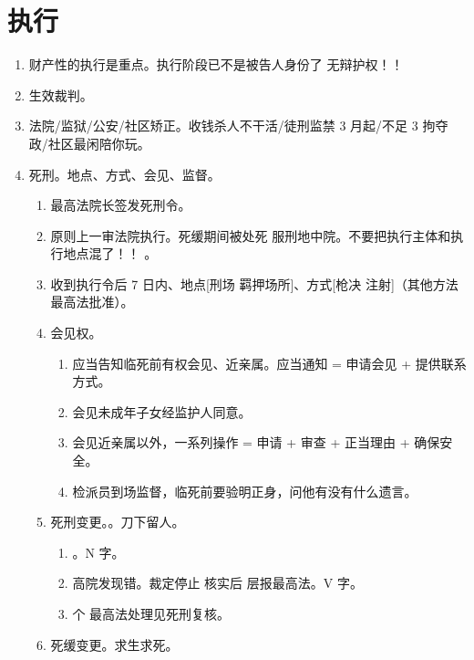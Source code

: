 \section{执行}
\begin{enumerate}
  \item 财产性的执行是重点。执行阶段已不是被告人身份了 \yjt 无辩护权！！
  \item 生效裁判。
  \item 法院/监狱/公安/社区矫正。收钱杀人不干活/徒刑监禁 3 月起/不足 3 拘夺政/社区最闲陪你玩。
  \item 死刑。地点、方式、会见、监督。
        \begin{enumerate}
          \item 最高法院长签发死刑令。
          \item 原则上一审法院执行。死缓期间被处死 \yjt 服刑地中院。不要把执行主体和执行地点混了！！
                。
          \item 收到执行令后 7 日内、地点[刑场 \hz 羁押场所]、方式[枪决 \hz 注射]（其他方法最高法批准）。
          \item 会见权。
                \begin{enumerate}
                  \item 应当告知临死前有权会见、近亲属。应当通知 = 申请会见 + 提供联系方式。
                  \item 会见未成年子女经监护人同意。
                  \item 会见近亲属以外，一系列操作 = 申请 + 审查 + 正当理由 + 确保安全。
                  \item 检派员到场监督，临死前要验明正身，问他有没有什么遗言。
                \end{enumerate}
          \item 死刑变更。。刀下留人。
                \begin{enumerate}
                  \item {}。N 字。
                  \item 高院发现错。裁定停止 \yjt 核实后 \yjt 层报最高法。V 字。
                  \item {} 个 \yjt 最高法处理见死刑复核。
                \end{enumerate}
          \item 死缓变更。求生求死。
                \begin{enumerate}

\end{enumerate}
\end{enumerate}
\end{enumerate}
